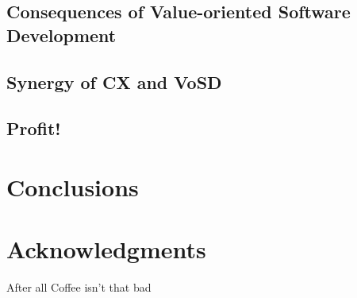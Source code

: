 \documentclass{sig-alternate}
\begin{document}
\subsection{Consequences of Value-oriented Software Development}
\subsection{Synergy of CX and VoSD}
\subsection{Profit!}

\section{Conclusions}

\section{Acknowledgments}

After all Coffee isn't that bad 

%

%
%
\end{document}
